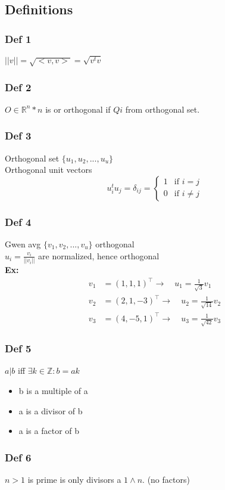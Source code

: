 \subsection{Definitions}
\subsubsection{Def 1}
$||v||=\sqrt{<v,v>}=\sqrt{v^tv}$
\subsubsection{Def 2}
$O\in \mathbb{R}^n*n$ is or orthogonal if $Qi$ from orthogonal set.
\subsubsection{Def 3}
Orthogonal set $\{u_1,u_2,...,u_u\}$ \\
Orthogonal unit vectors\\
\[
u_i^tu_j=\delta_{ij}= 
\begin{cases}
1 & \text{if } i = j \\
0 & \text{if } i \ne j
\end{cases}
\]
\subsubsection{Def 4}
Gwen avg $\{v_1,v_2,...,v_u\}$ orthogonal\\
$u_i = \frac{v_i}{||v_i||}$ are normalized, hence orthogonal\\
\textbf{Ex:}
\begin{align*}
v_1 &= (1, 1, 1)^\top \rightarrow\quad u_1 = \frac{1}{\sqrt{3}} v_1 \\
v_2 &= (2, 1, -3)^\top \rightarrow\quad u_2 = \frac{1}{\sqrt{14}} v_2 \\
v_3 &= (4, -5, 1)^\top \rightarrow\quad u_3 = \frac{1}{\sqrt{42}} v_3
\end{align*}
\subsubsection{Def 5}
$a|b$ iff $\exists k \in \mathbb{Z}: b=ak$\\
\begin{itemize}
  \item b is a multiple of a
  \item a is a divisor of b
  \item a is a factor of b
\end{itemize}
\subsubsection{Def 6}
$n>1$ is prime is only divisors a $1 \land n$. (no factors)
